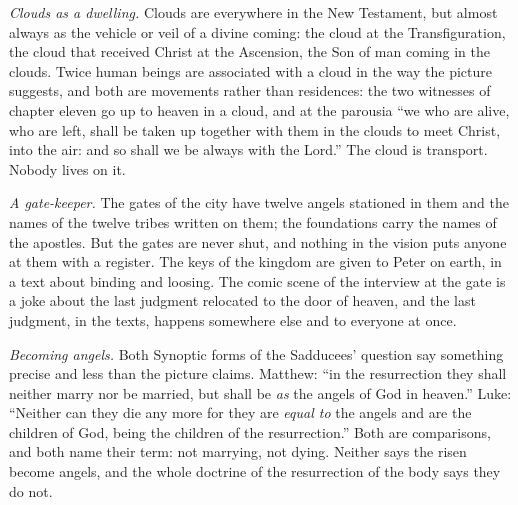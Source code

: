 \emph{Clouds as a dwelling.} Clouds are everywhere in the New Testament, but almost always as the vehicle or veil of a divine coming: the cloud at the Transfiguration, the cloud that received Christ at the Ascension, the Son of man coming in the clouds. Twice human beings are associated with a cloud in the way the picture suggests, and both are movements rather than residences: the two witnesses of chapter eleven go up to heaven in a cloud, and at the parousia ``we who are alive, who are left, shall be taken up together with them in the clouds to meet Christ, into the air: and so shall we be always with the Lord.'' The cloud is transport. Nobody lives on it.

\emph{A gate-keeper.} The gates of the city have twelve angels stationed in them and the names of the twelve tribes written on them; the foundations carry the names of the apostles. But the gates are never shut, and nothing in the vision puts anyone at them with a register. The keys of the kingdom are given to Peter on earth, in a text about binding and loosing. The comic scene of the interview at the gate is a joke about the last judgment relocated to the door of heaven, and the last judgment, in the texts, happens somewhere else and to everyone at once.

\emph{Becoming angels.} Both Synoptic forms of the Sadducees' question say something precise and less than the picture claims. Matthew: ``in the resurrection they shall neither marry nor be married, but shall be \emph{as} the angels of God in heaven.'' Luke: ``Neither can they die any more for they are \emph{equal to} the angels and are the children of God, being the children of the resurrection.'' Both are comparisons, and both name their term: not marrying, not dying. Neither says the risen become angels, and the whole doctrine of the resurrection of the body says they do not.

